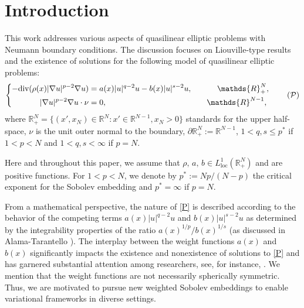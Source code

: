 \documentclass[12pt,reqno]{amsart}
\begin{document}
\section{Introduction}
 
This work addresses various aspects of quasilinear elliptic problems with Neumann boundary conditions. The discussion focuses on Liouville-type results and the existence of solutions for the following model of quasilinear elliptic problems:
\begin{equation}\label{P}
		\left\lbrace
		\begin{aligned}
			-\text{div}(\rho(x)|\nabla u|^{p-2}\nabla u ) &=a(x)|u|^{q-2}u-b(x)|u|^{s-2}u,\quad&\mathds{R}^N_+&,
			\vspace{0.2cm}\\
			|\nabla u|^{p-2}\nabla u\cdot\nu&=0,\quad &\mathds{R}^{N-1},
		\end{aligned}
		\right.
		\tag{$\mathcal{P}$}
	\end{equation} 
where $\mathds{R}^N_+=\{(x',x_N)\in \mathds{R}^N: x' \in \mathds{R}^{N-1}, x_N>0\}$ standards for the upper half-space,  $\nu$ is the unit outer normal to the boundary, $\partial\mathds{R}^N_+:=\mathds{R}^{N-1}$, $1< q, s \leq p^*$ if $1<p<N$ and $1< q, s<\infty$ if $p=N$.


Here and throughout this paper, we assume that $\rho, \, a, \, b  \in L^1_{\mathrm{loc}}(\mathds{R}^N_+)$  and are positive functions.
For $1<p<N$, we denote by $p^*:=Np/{(N-p)}$ the critical exponent for the Sobolev embedding and  $p^*=\infty$ if $p=N$. 

From a mathematical perspective, the nature of \eqref{P} is described according to the behavior of the competing terms $a(x)|u|^{q-2}u$ and $b(x)|u|^{s-2}u$ as determined by the integrability properties of the ratio $a(x)^{1/p}/b(x)^{1/s}$ (as discussed in  Alama-Tarantello  \cite{zbMATH00484529,zbMATH00943136}). The interplay between the weight functions $a(x)$ and $b(x)$ significantly impacts the existence and nonexistence of solutions to \eqref{P} and has garnered substantial attention among researchers, see, for instance, \cite{zbMATH00822783,zbMATH05308896}. 
We mention that the weight functions are not necessarily spherically symmetric.
Thus, we are motivated to pursue new weighted Sobolev embeddings to enable variational frameworks in diverse settings.
\end{document}

